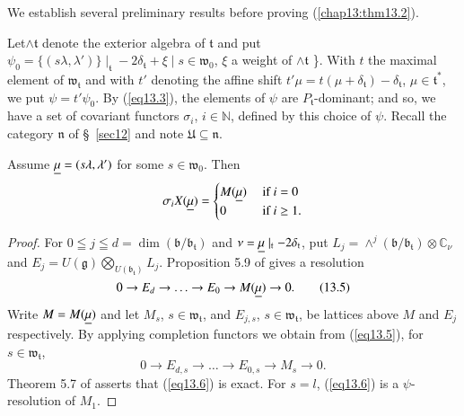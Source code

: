 We establish several preliminary results before proving (\ref{chap13:thm13.2}). 

Let\pageoriginale $\wedge \mathfrak{t}$ denote the exterior algebra of
$\mathfrak{t}$ and put $\psi_0 = \{(s\lambda, \lambda')\}
\mid_\mathfrak{t} - 2 \delta_\mathfrak{t} + \xi \mid s \in
\mathfrak{w}_0$,  $\xi$ a weight of $\wedge \mathfrak{t}$ \}. With $t$
the maximal element of $\mathfrak{w}_\mathfrak{t}$ and with $t'$
denoting the affine shift $t'\mu = t(\mu +\delta_\mathfrak{t}) -
\delta_\mathfrak{t}$, $\mu \in \mathfrak{t}^*$, we put $\psi =
t'\psi_0$. By (\ref{eq13.3}), the elements of $\psi$ are
$P_\mathfrak{t}$-dominant; and so, we have a set of covariant functors
$\sigma_i$, $i \in \mathbb{N}$, defined by this choice of $\psi$. Recall
the category $\mathfrak{n}$ of \S\ \ref{sec12} and note $\mathfrak{U}
\subseteq \mathfrak{n}$. 

\setcounter{prop}{3}
\begin{prop}\label{chap13:prop13.4}
Assume $\underline{\mu} = (s\lambda, \lambda')$ for some $s \in
\mathfrak{w}_0$. Then 
$$
\sigma_i X(\underline{\mu}) = 
\begin{cases}
M(\underline{\mu})&  \text{ if } i = 0\\
0 & \text{ if } i \geq 1. 
\end{cases}
$$
\end{prop}

\begin{proof}
For $0 \leqq j \leqq d = \dim (\mathfrak{b}/
\mathfrak{b}_\mathfrak{t})$  and $\nu = \underline{\mu} \mid_\mathfrak{t} - 2
\delta_\mathfrak{t}$, put $L_j = \wedge^j(\mathfrak{b}/
\mathfrak{b}_\mathfrak{t}) \otimes \mathbb{C}_\nu$ and $E_j =
U(\mathfrak{g}) \bigotimes\limits_{U(\mathfrak{b}_\mathfrak{t})}
L_j$. Proposition 5.9 of \cite{key15} gives a resolution
\begin{equation*}
0 \to E_d \to \ldots \to E_0 \to M(\underline{\mu}) \to 0. 
\tag{13.5}\label{eq13.5}
\end{equation*}
Write $M = M(\underline{\mu})$ and let $M_s$, $s \in
\mathfrak{w}_\mathfrak{t}$, and $E_{j,s}$, $s \in
\mathfrak{w}_\mathfrak{t}$, be lattices above $M$ and $E_j$
respectively. By applying completion functors we obtain from (\ref{eq13.5}),
for $s \in \mathfrak{w}_\mathfrak{t}$, 
\begin{equation*}
0 \to E_{d,s} \to \ldots \to E_{0,s} \to M_s \to 0. 
 \tag{13.6}\label{eq13.6}
\end{equation*}
Theorem 5.7 of \cite{key13} asserts that (\ref{eq13.6}) is exact. For $s=l$,
(\ref{eq13.6}) is a $\psi$-resolution of $M_1$. 
\end{proof}

